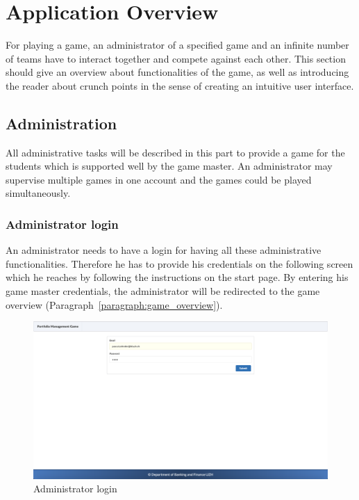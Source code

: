 \section{Application Overview}
\label{sec:application_overview}

For playing a game, an administrator of a specified game and an infinite number of teams have to interact together and compete against each other. This section should give an overview about functionalities of the game, as well as introducing the reader about crunch points in the sense of creating an intuitive user interface.

\subsection{Administration}
All administrative tasks will be described in this part to provide a game for the students which is supported well by the game master. An administrator may supervise multiple games in one account and the games could be played simultaneously.

\subsubsection{Administrator login}
An administrator needs to have a login for having all these administrative functionalities. Therefore he has to provide his credentials on the following screen which he reaches by following the instructions on the start page. By entering his game master credentials, the administrator will be redirected to the game overview (Paragraph~\ref{paragraph:game_overview}).
\begin{figure}[h!]
  \centering
  \includegraphics[scale=0.2]{img/application-overview/administrator/01_login.png}
  \caption{Administrator login}
\end{figure}

